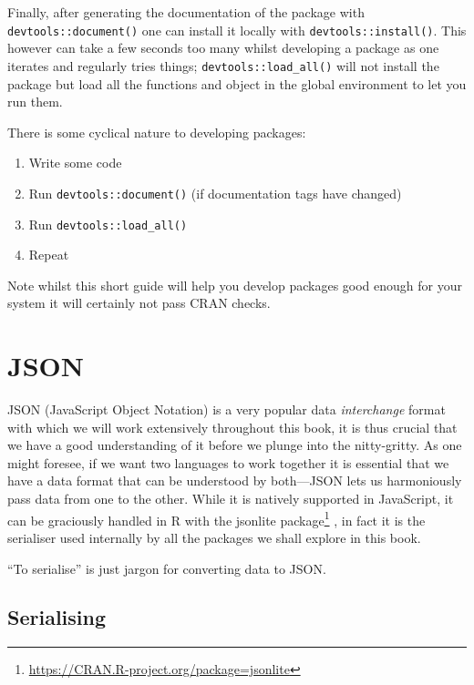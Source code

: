 \documentclass[
]{krantz}
\makeatletter
\providecommand{\tightlist}{%
  \setlength{\itemsep}{0pt}\setlength{\parskip}{0pt}}
\renewcommand{\href}[2]{#2\footnote{\url{#1}}}
\newenvironment{kframe}{%
\medskip{}
\setlength{\fboxsep}{.8em}
 \def\at@end@of@kframe{}%
 \ifinner\ifhmode%
  \def\at@end@of@kframe{\end{minipage}}%
  \begin{minipage}{\columnwidth}%
 \fi\fi%
 \def\FrameCommand##1{\hskip\@totalleftmargin \hskip-\fboxsep
 \colorbox{shadecolor}{##1}\hskip-\fboxsep
     \hskip-\linewidth \hskip-\@totalleftmargin \hskip\columnwidth}%
 \MakeFramed {\advance\hsize-\width
   \@totalleftmargin\z@ \linewidth\hsize
   \@setminipage}}%
 {\par\unskip\endMakeFramed%
 \at@end@of@kframe}
\newenvironment{rmdblock}[1]
  {
  \begin{itemize}
  \renewcommand{\labelitemi}{
    \raisebox{-.7\height}[0pt][0pt]{
      {\setkeys{Gin}{width=3em,keepaspectratio}\texttt{[image: images/\#1]}}
    }
  }
  \setlength{\fboxsep}{1em}
  \begin{kframe}
  \item
  }
  {
  \end{kframe}
  \end{itemize}
  }
\newenvironment{rmdnote}
  {\begin{rmdblock}{note}}
  {\end{rmdblock}}
\makeatother
\begin{document}
Finally, after generating the documentation of the package with \texttt{devtools::document()} one can install it locally with \texttt{devtools::install()}. This however can take a few seconds too many whilst developing a package as one iterates and regularly tries things; \texttt{devtools::load\_all()} will not install the package but load all the functions and object in the global environment to let you run them.

There is some cyclical nature to developing packages:

\begin{enumerate}
\def\labelenumi{\arabic{enumi}.}
\tightlist
\item
  Write some code
\item
  Run \texttt{devtools::document()} (if documentation tags have changed)
\item
  Run \texttt{devtools::load\_all()}
\item
  Repeat
\end{enumerate}

Note whilst this short guide will help you develop packages good enough for your system it will certainly not pass CRAN checks.

\hypertarget{basics-json}{%
\section{JSON}\label{basics-json}}

JSON (JavaScript Object Notation) is a very popular data \emph{interchange} format with which we will work extensively throughout this book, it is thus crucial that we have a good understanding of it before we plunge into the nitty-gritty. As one might foresee, if we want two languages to work together it is essential that we have a data format that can be understood by both---JSON lets us harmoniously pass data from one to the other. While it is natively supported in JavaScript, it can be graciously handled in R with the \href{https://CRAN.R-project.org/package=jsonlite}{jsonlite package} \citep{R-jsonlite}, in fact it is the serialiser used internally by all the packages we shall explore in this book.

\begin{rmdnote}
``To serialise'' is just jargon for converting data to JSON.
\end{rmdnote}

\hypertarget{serialising}{%
\subsection{Serialising}\label{serialising}}
\end{document}
